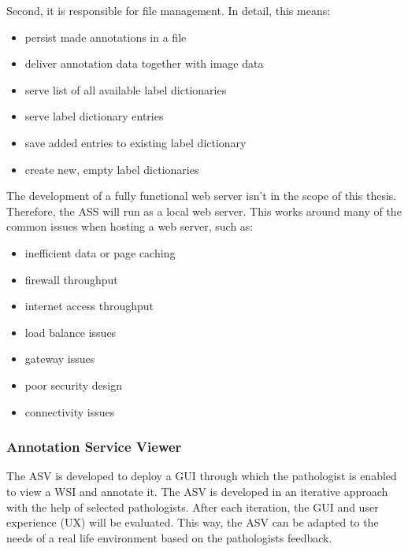 Second, it is responsible for file management. In detail, this means:
\begin{itemize}
	\item persist made annotations in a file
	\item deliver annotation data together with image data
	\item serve list of all available label dictionaries
	\item serve label dictionary entries
	\item save added entries to existing label dictionary
	\item create new, empty label dictionaries
\end{itemize} 

The development of a fully functional web server isn't in the scope of this thesis. Therefore, the ASS will run as a local web server. This works around many of the common issues when hosting a web server\cite{web:typicalissues}, such as:

\begin{itemize}
	\item inefficient data or page caching
	\item firewall throughput
	\item internet access throughput
	\item load balance issues
	\item gateway issues
	\item poor security design
	\item connectivity issues
\end{itemize}


\subsubsection{Annotation Service Viewer}
The ASV is developed to deploy a GUI through which the pathologist is enabled to view a WSI and annotate it. The ASV is developed in an iterative approach with the help of selected pathologists. After each iteration, the GUI and user experience (UX) will be evaluated. This way, the ASV can be adapted to the needs of a real life environment based on the pathologists feedback.

